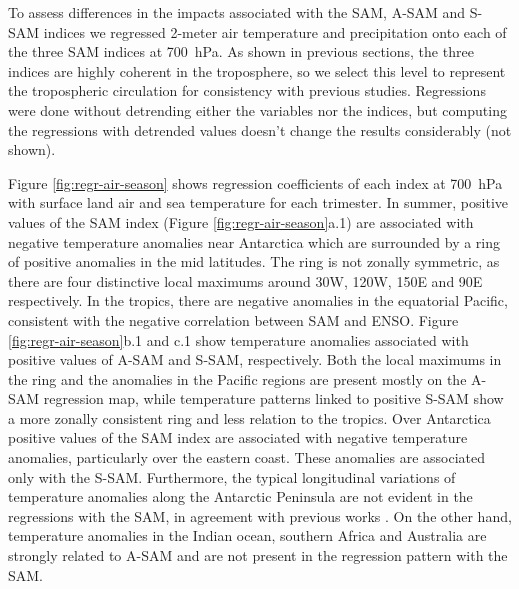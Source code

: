 \documentclass[smallextended]{svjour3}       %
\begin{document}
To assess differences in the impacts associated with the SAM, A\nobreakdash-SAM and S\nobreakdash-SAM indices we regressed 2-meter air temperature and precipitation onto each of the three SAM indices at 700~hPa.
As shown in previous sections, the three indices are highly coherent in the troposphere, so we select this level to represent the tropospheric circulation for consistency with previous studies.
Regressions were done without detrending either the variables nor the indices, but computing the regressions with detrended values doesn't change the results considerably (not shown).

Figure \ref{fig:regr-air-season} shows regression coefficients of each index at 700~hPa with surface land air and sea temperature for each trimester.
In summer, positive values of the SAM index (Figure \ref{fig:regr-air-season}a.1) are associated with negative temperature anomalies near Antarctica which are surrounded by a ring of positive anomalies in the mid latitudes.
The ring is not zonally symmetric, as there are four distinctive local maximums around 30\degree W, 120\degree W, 150\degree E and 90\degree E respectively.
In the tropics, there are negative anomalies in the equatorial Pacific, consistent with the negative correlation between SAM and ENSO.
Figure \ref{fig:regr-air-season}b.1 and c.1 show temperature anomalies associated with positive values of A\nobreakdash-SAM and S\nobreakdash-SAM, respectively.
Both the local maximums in the ring and the anomalies in the Pacific regions are present mostly on the A\nobreakdash-SAM regression map, while temperature patterns linked to positive S\nobreakdash-SAM show a more zonally consistent ring and less relation to the tropics.
Over Antarctica positive values of the SAM index are associated with negative temperature anomalies, particularly over the eastern coast.
These anomalies are associated only with the S\nobreakdash-SAM.
Furthermore, the typical longitudinal variations of temperature anomalies along the Antarctic Peninsula are not evident in the regressions with the SAM, in agreement with previous works \citep[e.g.][]{marshall2016}.
On the other hand, temperature anomalies in the Indian ocean, southern Africa and Australia are strongly related to A\nobreakdash-SAM and are not present in the regression pattern with the SAM.
\end{document}
